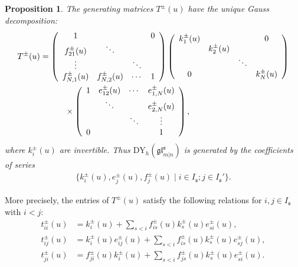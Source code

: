 \documentclass[a4paper,12pt]{article}
\newtheorem{prop}[theo]{Proposition}
\numberwithin{equation}{section}
\begin{document}
\begin{prop}\label{Gauss decomposition}
The generating matrices $T^{\pm}(u)$ have the unique Gauss decomposition:
\begin{align}\notag
T^{\pm}(u)&=\left(\begin{array}{cccc}
1 & & & 0 \\
f_{21}^{\pm}(u) & \ddots & &  \\
\vdots & & \ddots \\
f_{N, 1}^{\pm}(u) & f_{N, 2}^{\pm}(u) & \cdots & 1
\end{array}\right)
\left(\begin{array}{cccc}
k_1^{\pm}(u) & &  & 0 \\
& k_2^{\pm}(u) & &  \\
 & & \ddots & \\
0 &  & & k^{\pm}_{N}(u)
\end{array}\right)\\ \label{Gauss_dec}
&\hspace{3em}\times\left(\begin{array}{cccc}
1 & e_{12}^{\pm}(u) & \cdots & e_{1, N}^{\pm}(u) \\
& \ddots & & e_{2, N}^{\pm}(u) \\
& & \ddots & \vdots \\
0 & & & 1
\end{array}\right),
\end{align}
where $k_{i}^{\pm}(u)$ are invertible. Thus $\mathrm{DY}_{h}(\mathfrak{gl}^{\mathfrak{s}}_{m|n})$ is generated by the coefficients of series
\begin{align*}
\{k_{i}^{\pm}(u), e_{j}^{\pm}(u), f_{j}^{\pm}(u)\mid i\in I_{\mathfrak{s}}; j\in I_{\mathfrak{s}}'\}.
\end{align*}
\end{prop}

More precisely, the entries of $T^{\pm}(u)$ satisfy the following relations for  $i,j\in I_{\mathfrak{s}}$ with $i<j$:
\begin{align}\label{Gauss ii}
t_{ii}^{\pm}(u)&= k_{i}^{\pm}(u) + \sum_{s < i} f_{is}^{\pm}(u) k_{s}^{\pm}(u) e_{si}^{\pm}(u),\\ \label{Gauss ij}
t_{ij}^{\pm}(u)&= k_{i}^{\pm}(u) e_{ij}^{\pm}(u) + \sum_{s< i} f_{is}^{\pm}(u) k_{s}^{\pm}(u) e_{sj}^{\pm}(u),\\ \label{Gauss ji}
t_{ji}^{\pm}(u)&= f_{ji}^{\pm}(u) k_{i}^{\pm}(u) + \sum_{s <i} f_{js}^{\pm}(u) k_{s}^{\pm}(u) e_{si}^{\pm}(u).
\end{align}  
\end{document}
